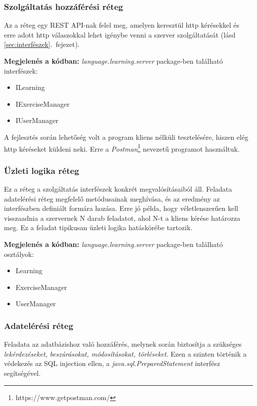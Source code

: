 \documentclass[11pt, a4paper]{article}
\begin{document}
    \subsubsection{Szolgáltatás hozzáférési réteg}
    Az a réteg egy REST API-nak felel meg, amelyen keresztül http kérésekkel és erre adott http válaszokkal lehet igénybe venni a szerver szolgáltatását (lásd \ref{sec:interfészek}.~fejezet).
    
    \textbf{Megjelenés a kódban:} \textit{language.learning.server} package-ben található interfészek: 
    \begin{itemize}
    	\item ILearning
    	\item IExerciseManager
    	\item IUserManager
    \end{itemize}
    
    A fejlesztés során lehetőség volt a program kliens nélküli tesztelésére, hiszen elég http kéréseket küldeni neki. Erre a \textit{Postman}\footnote{https://www.getpostman.com/} nevezetű programot használtuk.
    
    \subsubsection{Üzleti logika réteg}
    Ez a réteg a szolgáltatás interfészek konkrét megvalósításaiból áll. Feladata adatelérési réteg megfelelő metódusainak meghívása, és az eredmény az interfészben definiált formára hozása. Erre jó példa, hogy véletlenszerűen kell visszaadnia a szervernek N darab feladatot, ahol N-t a kliens kérése határozza meg. Ez a feladat tipikusan üzleti logika hatáskörébe tartozik.
    
    \textbf{Megjelenés a kódban:} \textit{language.learning.server} package-ben található osztályok: 
    \begin{itemize}
    	\item Learning
    	\item ExerciseManager
    	\item UserManager
    \end{itemize}
    
    \subsubsection{Adatelérési réteg}
    Feladata az adatbázishoz való hozzáférés, melynek során biztosítja a szükséges \textit{lekérdezéseket, beszúrásokat, módosításokat, törléseket}. Ezen a szinten történik a védekezés az SQL injection ellen, a \textit{java.sql.PreparedStatement} interfész segítségével.
    
\end{document}
